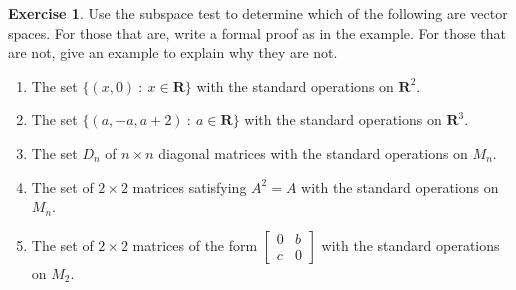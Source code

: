 \documentclass{beamer}
\newcommand{\R}{\mathbf{R}}
\newcommand{\fn}{\insertframenumber}
\theoremstyle{definition}
\newtheorem{exercise}{Exercise}
\begin{document}
\begin{frame}{\fn}
	\begin{exercise}\label{subspaces}
		Use the subspace test to determine which of the following are vector spaces. For those that are, write a formal proof as in the example. For those that are not, give an example to explain why they are not.
	\begin{enumerate}[label=(\alph*)]
		\item The set $\{(x,0)\ :\ x\in\R\}$ with the standard operations on $\R^2$.
		\item The set $\{(a,-a,a+2)\ :\ a\in\R\}$ with the standard operations on $\R^3$.
		\item The set $D_n$ of $n\times n$ diagonal matrices with the standard operations on $M_n$.
		\item The set of $2\times 2$ matrices satisfying $A^2=A$ with the standard operations on $M_n$.
		\item The set of $2\times 2$ matrices of the form $\begin{bmatrix}0&b\\c&0\end{bmatrix}$ with the standard operations on $M_2$.
	\end{enumerate}
	\end{exercise}
\end{frame}
\end{document}

